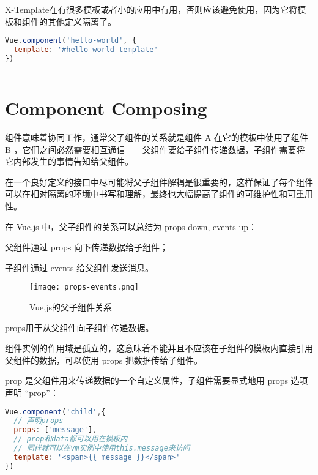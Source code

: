 X-Template在有很多模板或者小的应用中有用，否则应该避免使用，因为它将模板和组件的其他定义隔离了。

\begin{lstlisting}[language=JavaScript]
Vue.component('hello-world', {
  template: '#hello-world-template'
})
\end{lstlisting}





\begin{lstlisting}[language=JavaScript]

\end{lstlisting}






\section{Component Composing}

组件意味着协同工作，通常父子组件的关系就是组件 A 在它的模板中使用了组件 B ，它们之间必然需要相互通信——父组件要给子组件传递数据，子组件需要将它内部发生的事情告知给父组件。

在一个良好定义的接口中尽可能将父子组件解耦是很重要的，这样保证了每个组件可以在相对隔离的环境中书写和理解，最终也大幅提高了组件的可维护性和可重用性。

在 Vue.js 中，父子组件的关系可以总结为 props down, events up：

\begin{compactitem}
\item 父组件通过 props 向下传递数据给子组件；
\item 子组件通过 events 给父组件发送消息。
\end{compactitem}

\begin{figure}[htbp]
\centering
\texttt{[image: props-events.png]}
\caption{Vue.js的父子组件关系}
\end{figure}



props用于从父组件向子组件传递数据。

组件实例的作用域是孤立的，这意味着不能并且不应该在子组件的模板内直接引用父组件的数据，可以使用 props 把数据传给子组件。

prop 是父组件用来传递数据的一个自定义属性，子组件需要显式地用 props 选项声明 “prop”：

\begin{lstlisting}[language=JavaScript]
Vue.component('child',{
  // 声明props
  props: ['message'],
  // prop和data都可以用在模板内
  // 同样就可以在vm实例中使用this.message来访问
  template: '<span>{{ message }}</span>'
})
\end{lstlisting}

